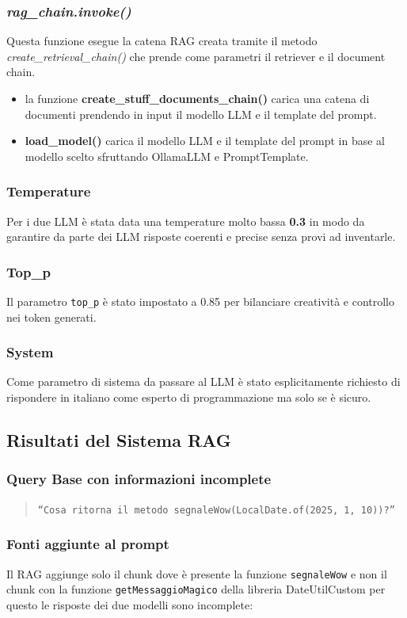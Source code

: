 \documentclass[12pt,a4paper,openright,twoside]{book}
\begin{document}
\subsubsection{\emph{rag\_chain.invoke()}}
 Questa funzione esegue la catena RAG creata tramite il metodo \emph{create\_retrieval\_chain()} che prende come parametri il retriever e il document chain.
 \begin{itemize}
    \item la funzione \textbf{create\_stuff\_documents\_chain()} carica una catena di documenti prendendo in input il modello LLM e il template del prompt.
    \item \textbf{load\_model()} carica il modello LLM e il template del prompt in base al modello scelto sfruttando OllamaLLM e PromptTemplate.
 \end{itemize}
 \subsubsection{Temperature}
Per i due LLM è stata data una temperature molto bassa \textbf{0.3} in modo da garantire da parte dei LLM risposte coerenti e precise senza provi ad inventarle.
\subsubsection{Top\_p}
Il parametro \texttt{top\_p} è stato impostato a 0.85 per bilanciare creatività e controllo nei token generati.
\subsubsection{System}
Come parametro di sistema da passare al LLM è stato esplicitamente richiesto di rispondere in italiano come esperto di programmazione ma solo se è sicuro.

\subsection{Risultati del Sistema RAG}
\subsubsection{Query Base con informazioni incomplete}
\begin{quote}
    \texttt{``Cosa ritorna il metodo segnaleWow(LocalDate.of(2025, 1, 10))?''}
\end{quote}
\subsubsection{Fonti aggiunte al prompt}
Il RAG aggiunge solo il chunk dove è presente la funzione \texttt{segnaleWow} e non il chunk con la funzione \texttt{getMessaggioMagico} della libreria DateUtilCustom
per questo le risposte dei due modelli sono incomplete:
\end{document}
